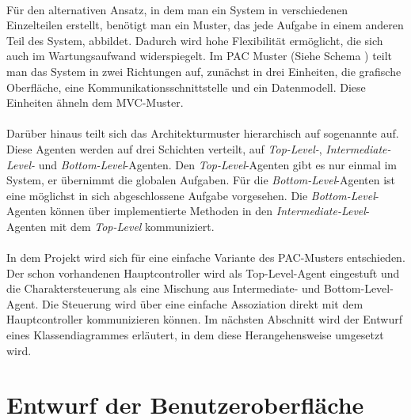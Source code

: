 \paragraph{}
Für den alternativen Ansatz, in dem man ein System in verschiedenen Einzelteilen erstellt, benötigt man ein Muster, das jede Aufgabe in einem anderen Teil des System, abbildet. Dadurch wird hohe Flexibilität ermöglicht, die sich auch im Wartungsaufwand widerspiegelt.
Im PAC Muster (Siehe Schema ) teilt man das System in zwei Richtungen auf, zunächst in drei Einheiten, die grafische Oberfläche, eine Kommunikationsschnittstelle und ein Datenmodell. Diese Einheiten ähneln dem MVC-Muster.
\paragraph{}
Darüber hinaus teilt sich das Architekturmuster hierarchisch auf sogenannte  auf.
Diese Agenten werden auf drei Schichten verteilt, auf \textit{Top-Level-}, \textit{Intermediate-Level-} und \textit{Bottom-Level}-Agenten. Den \textit{Top-Level}-Agenten gibt es nur einmal im System, er übernimmt die globalen Aufgaben. Für die \textit{Bottom-Level}-Agenten ist eine möglichst in sich abgeschlossene Aufgabe vorgesehen. Die \textit{Bottom-Level}-Agenten können über implementierte Methoden in den \textit{Intermediate-Level}-Agenten mit dem \textit{Top-Level} kommuniziert.
\paragraph{}
In dem Projekt wird sich für eine einfache Variante des PAC-Musters entschieden. Der schon vorhandenen Hauptcontroller wird als Top-Level-Agent eingestuft und die Charaktersteuerung als eine Mischung aus Intermediate- und Bottom-Level-Agent. Die Steuerung wird über eine einfache Assoziation direkt mit dem Hauptcontroller kommunizieren können. Im nächsten Abschnitt wird der Entwurf eines Klassendiagrammes erläutert, in dem diese Herangehensweise umgesetzt wird.

\section{Entwurf der Benutzeroberfläche}
